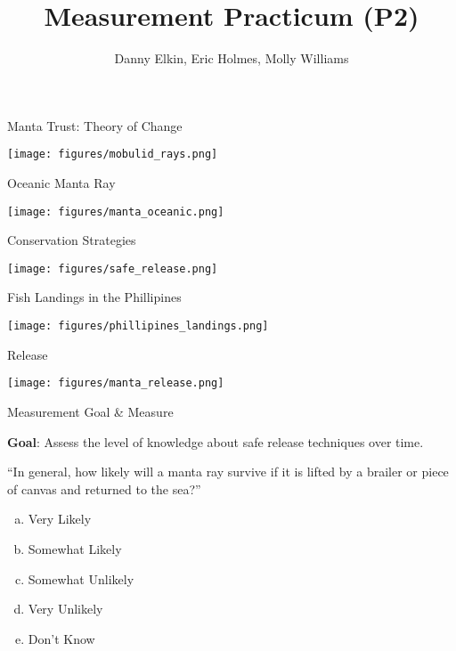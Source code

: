 \documentclass[ignorenonframetext,]{beamer}
\title{Measurement Practicum (P2)}
\author{Danny Elkin, Eric Holmes, Molly Williams}
\date{}
\providecommand{\tightlist}{%
  \setlength{\itemsep}{0pt}\setlength{\parskip}{0pt}}
\begin{document}
\frame{\titlepage}

\begin{frame}{Manta Trust: Theory of Change}
\protect\hypertarget{manta-trust-theory-of-change}{}

\texttt{[image: figures/mobulid\_rays.png]}

\end{frame}

\begin{frame}{Oceanic Manta Ray}
\protect\hypertarget{oceanic-manta-ray}{}

\texttt{[image: figures/manta\_oceanic.png]}

\end{frame}

\begin{frame}{Conservation Strategies}
\protect\hypertarget{conservation-strategies}{}

\texttt{[image: figures/safe\_release.png]}

\end{frame}

\begin{frame}{Fish Landings in the Phillipines}
\protect\hypertarget{fish-landings-in-the-phillipines}{}

\texttt{[image: figures/phillipines\_landings.png]}

\end{frame}

\begin{frame}{Release}
\protect\hypertarget{release}{}

\texttt{[image: figures/manta\_release.png]}

\end{frame}

\begin{frame}{Measurement Goal \& Measure}
\protect\hypertarget{measurement-goal-measure}{}

\textbf{Goal}: Assess the level of knowledge about safe release
techniques over time.

``In general, how likely will a manta ray survive if it is lifted by a
brailer or piece of canvas and returned to the sea?''

\begin{enumerate}
[a.]
\tightlist
\item
  Very Likely
\item
  Somewhat Likely
\item
  Somewhat Unlikely
\item
  Very Unlikely
\item
  Don't Know
\end{enumerate}

\end{frame}
\end{document}
